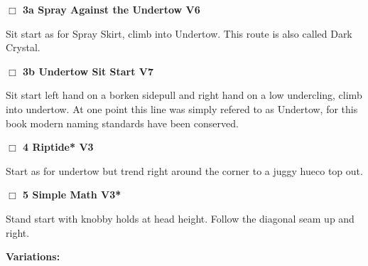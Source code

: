 \begin{multicols}{2}
\begin{adjustwidth}{0.5cm}{}
\needspace{2em}
\label{vr:Spray Against the Undertow}
\colorbox{RoyalBlue!20}{
\parbox{0.95\linewidth}{
\hspace{-1ex}\textbf{$\Box$
3a Spray Against the Undertow V6  
}}}
\begin{adjustwidth}{1.3em}{}			

Sit start as for Spray Skirt, climb into Undertow. This route is also called Dark Crystal.
\end{adjustwidth}




\needspace{2em}
\label{vr:Undertow Sit Start}
\colorbox{Goldenrod!20}{
\parbox{0.95\linewidth}{
\hspace{-1ex}\textbf{$\Box$
3b Undertow Sit Start V7  
}}}
\begin{adjustwidth}{1.3em}{}			

Sit start left hand on a borken sidepull and right hand on a low undercling, climb into undertow. At one point this line was simply refered to as Undertow, for this book modern naming standards have been conserved.
\end{adjustwidth}



\end{adjustwidth}


\needspace{2em}
\label{rt:Riptide}
\colorbox{green!20}{
\parbox{0.95\linewidth}{
\hspace{-1ex}\textbf{$\Box$
4 Riptide* V3  
}}}
\begin{adjustwidth}{1.3em}{}			

Start as for undertow but trend right around the corner to a juggy hueco top out.
\end{adjustwidth}




\needspace{2em}
\label{rt:Simple Math}
\colorbox{green!20}{
\parbox{0.95\linewidth}{
\hspace{-1ex}\textbf{$\Box$
5 Simple Math V3*  
}}}
\begin{adjustwidth}{1.3em}{}			

Stand start with knobby holds at head height. Follow the diagonal seam up and right.
\end{adjustwidth}


\begin{adjustwidth}{0.5cm}{}				
\needspace{4em}
\textbf{Variations:} \newline


\end{adjustwidth}
\end{multicols}
